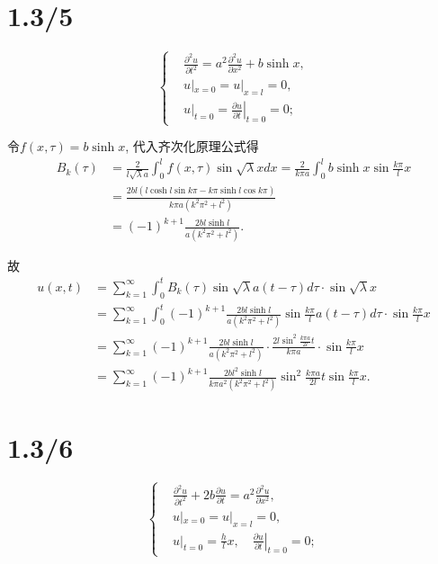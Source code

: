 \documentclass[11pt,a4paper]{article}
\begin{document}
\section{1.3/5}

$$
  \left\{\begin{aligned}
     & \frac{\partial^2u}{\partial t^2}=
    a^2\frac{\partial^2u}{\partial x^2}+b\sinh x,                   \\
     & u|_{x=0}=u|_{x=l}=0,                                         \\
     & u|_{t=0}=\left.\frac{\partial u}{\partial t}\right|_{t=0}=0;
  \end{aligned}\right.
$$

令$f(x,\tau)=b\sinh x$, 代入齐次化原理公式得
\begin{align*}
  B_k(\tau)
   & =\frac{2}{l\sqrt{\lambda}a}\int_0^lf(x,\tau)\sin\sqrt{\lambda}xdx
  =\frac{2}{k\pi a}\int_0^lb\sinh x\sin\frac{k\pi}{l}x                         \\
   & =\frac{2bl(l\cosh l\sin k\pi-k\pi\sinh l\cos k\pi)}{k\pi a(k^2\pi^2+l^2)} \\
   & =(-1)^{k+1}\frac{2bl\sinh l}{a(k^2\pi^2+l^2)}.
\end{align*}

故
\begin{align*}
  u(x,t) & =\sum_{k=1}^\infty\int_0^t B_k(\tau)\sin\sqrt{\lambda}a(t-\tau)d\tau\cdot\sin\sqrt{\lambda}x                                          \\
         & =\sum_{k=1}^\infty\int_0^t (-1)^{k+1}\frac{2bl\sinh l}{a(k^2\pi^2+l^2)}\sin\frac{k\pi}{l}a(t-\tau)d\tau\cdot\sin\frac{k\pi}{l}x       \\
         & =\sum_{k=1}^\infty (-1)^{k+1}\frac{2bl\sinh l}{a(k^2\pi^2+l^2)}\cdot\frac{2l\sin^2\frac{k\pi a}{2l}t}{k\pi a}\cdot\sin\frac{k\pi}{l}x \\
         & =\sum_{k=1}^\infty (-1)^{k+1}\frac{2bl^2\sinh l}{k\pi a^2(k^2\pi^2+l^2)}\sin^2\frac{k\pi a}{2l}t\sin\frac{k\pi}{l}x.
\end{align*}

\section{1.3/6}

$$
  \left\{\begin{aligned}
     & \frac{\partial^2u}{\partial t^2}+2b\frac{\partial u}{\partial t}=
    a^2\frac{\partial^2u}{\partial x^2},                                 \\
     & u|_{x=0}=u|_{x=l}=0,                                              \\
     & u|_{t=0}=\frac{h}{l}x,
    \quad \left.\frac{\partial u}{\partial t}\right|_{t=0}=0;
  \end{aligned}\right.
$$
\end{document}
